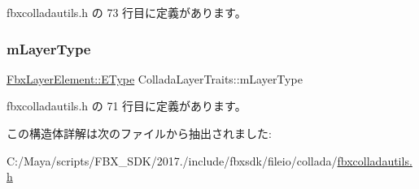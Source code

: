 fbxcolladautils.\+h の 73 行目に定義があります。

\mbox{\label{struct_collada_layer_traits_a3e6c41211a794e53cfc029a7c7093784}} 
\subsubsection{\texorpdfstring{m\+Layer\+Type}{mLayerType}}
{\footnotesize\ttfamily \hyperlink{class_fbx_layer_element_a8c95c5cd880b56c776acd379bd86f42c}{Fbx\+Layer\+Element\+::\+E\+Type} Collada\+Layer\+Traits\+::m\+Layer\+Type}



 fbxcolladautils.\+h の 71 行目に定義があります。



この構造体詳解は次のファイルから抽出されました\+:\begin{DoxyCompactItemize}
\item 
C\+:/\+Maya/scripts/\+F\+B\+X\+\_\+\+S\+D\+K/2017./include/fbxsdk/fileio/collada/\hyperlink{fbxcolladautils_8h}{fbxcolladautils.\+h}\end{DoxyCompactItemize}
